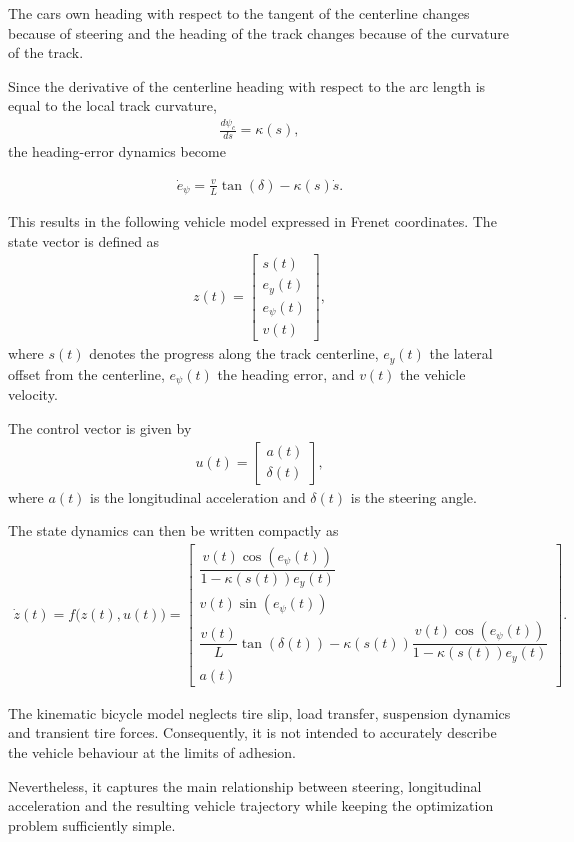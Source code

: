 The cars own heading with respect to the tangent of the centerline changes because of steering and the heading of the track changes because of the curvature of the track.

Since the derivative of the centerline heading with respect to the arc length is equal to the local track curvature,
\begin{align*}
    \frac{d\psi_c}{ds}=\kappa(s),
\end{align*}
the heading-error dynamics become

\begin{align*}
    \dot e_\psi = \frac{v}{L} \tan(\delta) - \kappa(s)\dot s.
\end{align*}

This results in the following vehicle model expressed in Frenet coordinates.
The state vector is defined as
\begin{align*}
    z(t)
    =
    \begin{bmatrix}
        s(t)\\
        e_y(t)\\
        e_\psi(t)\\
        v(t)
    \end{bmatrix},
\end{align*}
where \(s(t)\) denotes the progress along the track centerline,
\(e_y(t)\) the lateral offset from the centerline,
\(e_\psi(t)\) the heading error, and \(v(t)\) the vehicle velocity.

The control vector is given by
\begin{align*}
    u(t)
    =
    \begin{bmatrix}
        a(t)\\
        \delta(t)
    \end{bmatrix},
\end{align*}
where \(a(t)\) is the longitudinal acceleration and \(\delta(t)\) is the
steering angle.

The state dynamics can then be written compactly as
\begin{align*}
    \dot z(t)
    =
    f\bigl(z(t),u(t)\bigr)
    =
    \begin{bmatrix}
        \dfrac{v(t)\cos(e_\psi(t))}
        {1-\kappa(s(t))e_y(t)}
        \\[3ex]
        v(t)\sin(e_\psi(t))
        \\[1.5ex]
        \dfrac{v(t)}{L}\tan(\delta(t))
        -
        \kappa(s(t))
        \dfrac{v(t)\cos(e_\psi(t))}
        {1-\kappa(s(t))e_y(t)}
        \\[1.5ex]
        a(t)
    \end{bmatrix}.
\end{align*}

The kinematic bicycle model neglects tire slip, load transfer,
suspension dynamics and transient tire forces.
Consequently, it is not intended to accurately describe the vehicle behaviour
at the limits of adhesion.

Nevertheless, it captures the main relationship between steering,
longitudinal acceleration and the resulting vehicle trajectory while keeping
the optimization problem sufficiently simple.